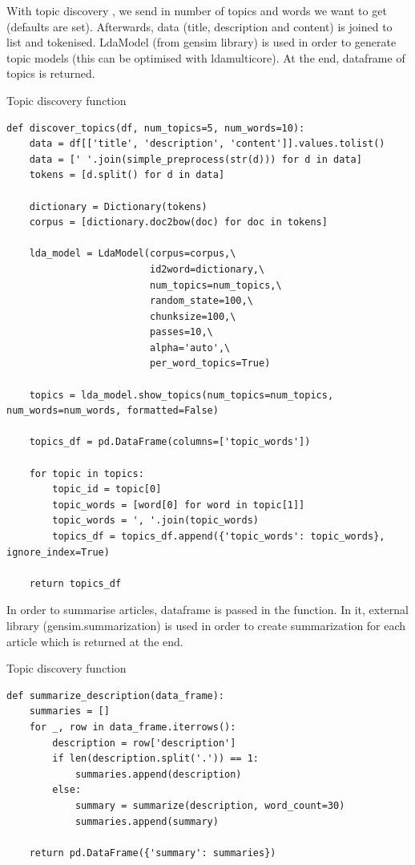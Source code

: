With topic discovery \parencite{pons2007topic}, we send in number of topics and words we want to get (defaults are set). Afterwards, data (title, description and content) is joined to list and tokenised. LdaModel (from gensim library) is used in order to generate topic models (this can be optimised with ldamulticore). At the end, dataframe of topics is returned.
\begin{listing}[H]
\caption{Topic discovery function}
\begin{verbatim}
def discover_topics(df, num_topics=5, num_words=10):
    data = df[['title', 'description', 'content']].values.tolist()
    data = [' '.join(simple_preprocess(str(d))) for d in data]
    tokens = [d.split() for d in data]

    dictionary = Dictionary(tokens)
    corpus = [dictionary.doc2bow(doc) for doc in tokens]

    lda_model = LdaModel(corpus=corpus,\
                         id2word=dictionary,\
                         num_topics=num_topics,\
                         random_state=100,\
                         chunksize=100,\
                         passes=10,\
                         alpha='auto',\
                         per_word_topics=True)

    topics = lda_model.show_topics(num_topics=num_topics, num_words=num_words, formatted=False)

    topics_df = pd.DataFrame(columns=['topic_words'])

    for topic in topics:
        topic_id = topic[0]
        topic_words = [word[0] for word in topic[1]]
        topic_words = ', '.join(topic_words)
        topics_df = topics_df.append({'topic_words': topic_words}, ignore_index=True)

    return topics_df
\end{verbatim}
\end{listing}

In order to summarise articles, dataframe is passed in the function. In it, external library (gensim.summarization) \parencite{web:Gensim} is used in order to create summarization for each article which is returned at the end.
\begin{listing}[H]
\caption{Topic discovery function}
\begin{verbatim}
def summarize_description(data_frame):
    summaries = []
    for _, row in data_frame.iterrows():
        description = row['description']
        if len(description.split('.')) == 1:
            summaries.append(description)
        else:
            summary = summarize(description, word_count=30)
            summaries.append(summary)
            
    return pd.DataFrame({'summary': summaries})
\end{verbatim}
\end{listing}

